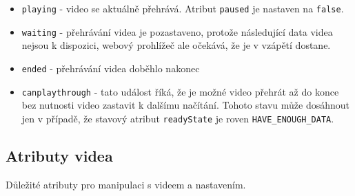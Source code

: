 \begin{itemize}
	\item \texttt{playing} - video se aktuálně přehrává. Atribut \texttt{paused} je nastaven na \texttt{false}.	
	
	\item \texttt{waiting} - přehrávání videa je pozastaveno, protože následující data videa nejsou k dispozici, webový prohlížeč ale očekává, že je v vzápětí dostane.
	
	\item \texttt{ended} - přehrávání videa doběhlo nakonec
	
	\item \texttt{canplaythrough} - tato událost říká, že je možné video přehrát až do konce bez nutnosti video zastavit k dalšímu načítání. Tohoto stavu může dosáhnout jen v případě, že stavový atribut \texttt{readyState} je roven \texttt{HAVE\_ENOUGH\_DATA}.
	
\end{itemize}

\newpage

\subsection{Atributy videa}
Důležité atributy pro manipulaci s videem a nastavením.



